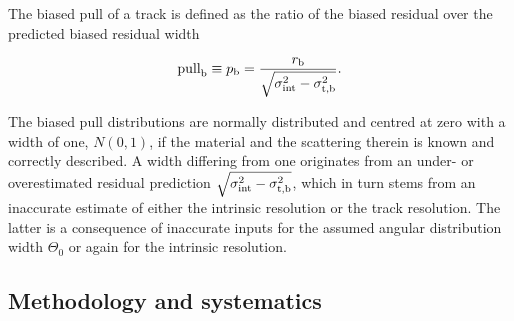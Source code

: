 The biased pull of a track is defined as the ratio of the biased residual over the predicted biased residual width

\begin{equation}
 \textrm{pull}_{\textrm{b}} \equiv p_{\textrm{b}} = \frac{r_{\textrm{b}}}{\sqrt{\sigma_{\textrm{int}}^2 - \sigma_{\textrm{t,b}}^2}}.
 \label{eq:pull}
\end{equation}

\noindent
The biased pull distributions are normally distributed and centred at zero with a width of one, $N(0,1)$, if the material and the scattering therein is known and correctly described. 
A width differing from one originates from an under- or overestimated residual prediction $\sqrt{\sigma_{\textrm{int}}^2 - \sigma_{\textrm{t,b}}^2}$, which in turn stems from an inaccurate estimate of either the intrinsic resolution
 or the track resolution. 
The latter is a consequence of inaccurate inputs for the assumed angular distribution width $\Theta_0$ or again for the intrinsic resolution. 


\subsection{Methodology and systematics}
\label{sec:meth}


